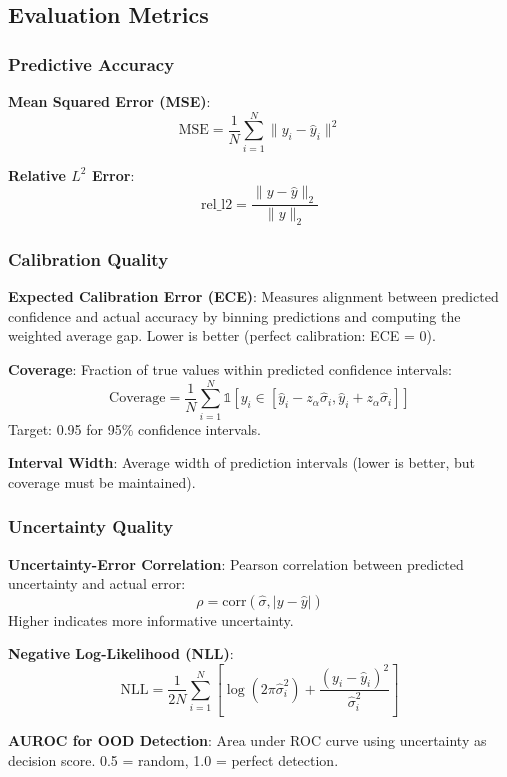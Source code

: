 \subsection{Evaluation Metrics}

\subsubsection{Predictive Accuracy}

\textbf{Mean Squared Error (MSE)}:
\begin{equation}
    \text{MSE} = \frac{1}{N}\sum_{i=1}^{N} \|y_i - \hat{y}_i\|^2
\end{equation}

\textbf{Relative $L^2$ Error}:
\begin{equation}
    \text{rel\_l2} = \frac{\|y - \hat{y}\|_2}{\|y\|_2}
\end{equation}

\subsubsection{Calibration Quality}

\textbf{Expected Calibration Error (ECE)}: Measures alignment between predicted confidence and actual accuracy by 
binning predictions and computing the weighted average gap. Lower is better (perfect calibration: ECE = 0).

\textbf{Coverage}: Fraction of true values within predicted confidence intervals:
\begin{equation}
    \text{Coverage} = \frac{1}{N}\sum_{i=1}^{N} \mathbb{1}\left[y_i \in [\hat{y}_i - z_\alpha\hat{\sigma}_i, \hat{y}_i + z_\alpha\hat{\sigma}_i]\right]
\end{equation}
Target: 0.95 for 95\% confidence intervals.

\textbf{Interval Width}: Average width of prediction intervals (lower is better, but coverage must be maintained).

\subsubsection{Uncertainty Quality}

\textbf{Uncertainty-Error Correlation}: Pearson correlation between predicted uncertainty and actual error:
\begin{equation}
    \rho = \text{corr}(\hat{\sigma}, |y - \hat{y}|)
\end{equation}
Higher indicates more informative uncertainty.

\textbf{Negative Log-Likelihood (NLL)}:
\begin{equation}
    \text{NLL} = \frac{1}{2N}\sum_{i=1}^{N} \left[\log(2\pi\hat{\sigma}_i^2) + \frac{(y_i - \hat{y}_i)^2}{\hat{\sigma}_i^2}\right]
\end{equation}

\textbf{AUROC for OOD Detection}: Area under ROC curve using uncertainty as decision score. 0.5 = random, 1.0 = 
perfect detection.
